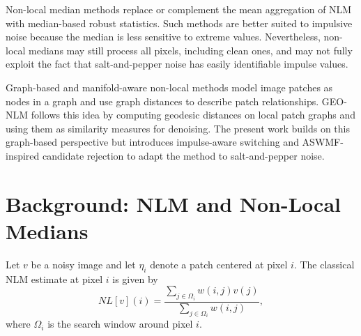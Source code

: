 \documentclass{ieeeaccess}
\begin{document}
Non-local median methods replace or complement the mean aggregation of NLM with median-based robust statistics. Such methods are better suited to impulsive noise because the median is less sensitive to extreme values. Nevertheless, non-local medians may still process all pixels, including clean ones, and may not fully exploit the fact that salt-and-pepper noise has easily identifiable impulse values.

Graph-based and manifold-aware non-local methods model image patches as nodes in a graph and use graph distances to describe patch relationships. GEO-NLM follows this idea by computing geodesic distances on local patch graphs and using them as similarity measures for denoising. The present work builds on this graph-based perspective but introduces impulse-aware switching and ASWMF-inspired candidate rejection to adapt the method to salt-and-pepper noise.

\section{Background: NLM and Non-Local Medians}
\label{sec:background}

Let $v$ be a noisy image and let $\eta_i$ denote a patch centered at pixel $i$. The classical NLM estimate at pixel $i$ is given by
\begin{equation}
NL[v](i) =
\frac{\sum_{j \in \Omega_i} w(i,j)v(j)}
{\sum_{j \in \Omega_i} w(i,j)},
\label{eq:nlm}
\end{equation}
where $\Omega_i$ is the search window around pixel $i$.
\end{document}
